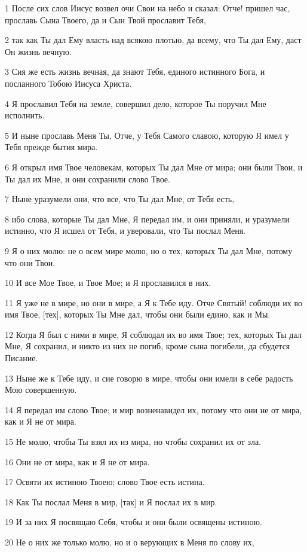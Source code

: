 \par 1 После сих слов Иисус возвел очи Свои на небо и сказал: Отче! пришел час, прославь Сына Твоего, да и Сын Твой прославит Тебя,
\par 2 так как Ты дал Ему власть над всякою плотью, да всему, что Ты дал Ему, даст Он жизнь вечную.
\par 3 Сия же есть жизнь вечная, да знают Тебя, единого истинного Бога, и посланного Тобою Иисуса Христа.
\par 4 Я прославил Тебя на земле, совершил дело, которое Ты поручил Мне исполнить.
\par 5 И ныне прославь Меня Ты, Отче, у Тебя Самого славою, которую Я имел у Тебя прежде бытия мира.
\par 6 Я открыл имя Твое человекам, которых Ты дал Мне от мира; они были Твои, и Ты дал их Мне, и они сохранили слово Твое.
\par 7 Ныне уразумели они, что все, что Ты дал Мне, от Тебя есть,
\par 8 ибо слова, которые Ты дал Мне, Я передал им, и они приняли, и уразумели истинно, что Я исшел от Тебя, и уверовали, что Ты послал Меня.
\par 9 Я о них молю: не о всем мире молю, но о тех, которых Ты дал Мне, потому что они Твои.
\par 10 И все Мое Твое, и Твое Мое; и Я прославился в них.
\par 11 Я уже не в мире, но они в мире, а Я к Тебе иду. Отче Святый! соблюди их во имя Твое, [тех], которых Ты Мне дал, чтобы они были едино, как и Мы.
\par 12 Когда Я был с ними в мире, Я соблюдал их во имя Твое; тех, которых Ты дал Мне, Я сохранил, и никто из них не погиб, кроме сына погибели, да сбудется Писание.
\par 13 Ныне же к Тебе иду, и сие говорю в мире, чтобы они имели в себе радость Мою совершенную.
\par 14 Я передал им слово Твое; и мир возненавидел их, потому что они не от мира, как и Я не от мира.
\par 15 Не молю, чтобы Ты взял их из мира, но чтобы сохранил их от зла.
\par 16 Они не от мира, как и Я не от мира.
\par 17 Освяти их истиною Твоею; слово Твое есть истина.
\par 18 Как Ты послал Меня в мир, [так] и Я послал их в мир.
\par 19 И за них Я посвящаю Себя, чтобы и они были освящены истиною.
\par 20 Не о них же только молю, но и о верующих в Меня по слову их,
